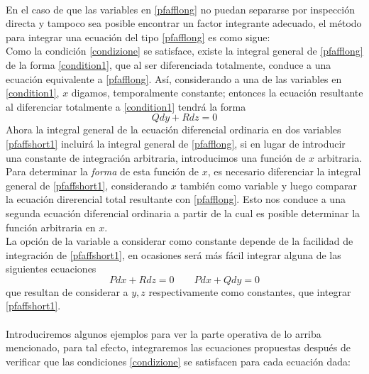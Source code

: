 \documentclass{article}
\theoremstyle{definition} \newtheorem{defi}{Definici\'on}
\theoremstyle{definition} \newtheorem{teo}{Teorema}
\theoremstyle{definition} \newtheorem{cor}{Corolario}
\begin{document}
\paragraph{} 
En el caso de que las variables en \eqref{pfafflong} no puedan separarse por inspecci\'on directa y tampoco sea posible encontrar un factor integrante adecuado, el m\'etodo para integrar una ecuaci\'on del tipo \eqref{pfafflong} es como sigue:\\
Como la condici\'on \eqref{condizione} se satisface, existe la integral general de \eqref{pfafflong} de la forma \eqref{condition1}, que al ser diferenciada totalmente, conduce a una ecuaci\'on equivalente a \eqref{pfafflong}. As\'i, considerando a una de las variables en \eqref{condition1}, $x$ digamos, temporalmente constante; entonces la ecuaci\'on resultante al diferenciar totalmente a \eqref{condition1} tendr\'a la forma
\begin{equation}\label{pfaffshort1}
Qdy+Rdz=0
\end{equation}
Ahora la integral general de la ecuaci\'on diferencial ordinaria en dos variables \eqref{pfaffshort1} incluir\'a la integral general de \eqref{pfafflong}, si en lugar de introducir una constante de integraci\'on arbitraria, introducimos una funci\'on de $x$ arbitraria. Para determinar la \emph{forma} de esta funci\'on de $x$, es necesario diferenciar la integral general de \eqref{pfaffshort1}, considerando $x$ tambi\'en como variable y luego comparar la ecuaci\'on direrencial total resultante con \eqref{pfafflong}. Esto nos conduce a una segunda ecuaci\'on diferencial ordinaria a partir de la cual es posible determinar la funci\'on arbitraria en $x$.\\
La opci\'on de la variable a considerar como constante depende de la facilidad de integraci\'on de \eqref{pfaffshort1}, en ocasiones ser\'a m\'as f\'acil integrar alguna de las siguientes ecuaciones
$$Pdx+Rdz=0 \qquad Pdx+Qdy=0$$
que resultan de considerar a $y,z$ respectivamente como constantes, que integrar \eqref{pfaffshort1}.
\paragraph{}
Introduciremos algunos ejemplos para ver la parte operativa de lo arriba mencionado, para tal efecto, integraremos las ecuaciones propuestas despu\'es de verificar que las condiciones \eqref{condizione} se satisfacen para cada ecuaci\'on dada:
\end{document}
